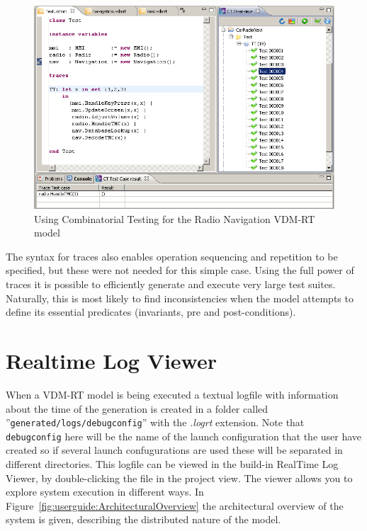 \begin{figure}[htbp]
\begin{center}
\includegraphics[width=4.5in]{figures/tracesradnav}
\caption{Using Combinatorial Testing for the Radio Navigation VDM-RT model\label{fig:tracesradnav}}
\end{center}
\end{figure}

The syntax for traces also enables operation sequencing and repetition to be
specified, but these were not needed for this simple case. Using the full power
of traces it is possible to efficiently generate and execute very large test
suites. Naturally, this is most likely to find inconsistencies when the model
attempts to define its essential predicates (invariants, pre and post-conditions).

\section{Realtime Log Viewer}\label{sec:RTLV}

When a VDM-RT model is being executed a textual logfile with
information about the time of the generation is created in
a folder called ''\texttt{generated/logs/debugconfig}'' with the
\emph{.logrt} extension. Note that \texttt{debugconfig} here will be
the name of the launch configuration that the user have created so if
several launch confugurations are used these will be separated in
different directories. This logfile can be viewed in the build-in
RealTime Log Viewer, by double-clicking the file in the project
view. The viewer allows you to explore system execution in different
ways. In Figure~\ref{fig:userguide:ArchitecturalOverview} the
architectural overview of the system is given, describing the
distributed nature of the model.

